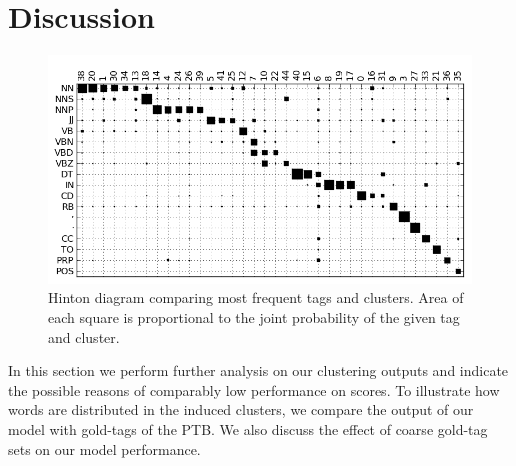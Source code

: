 \section{Discussion}
\label{sec:discuss}
\begin{figure}[ht] \centering
\includegraphics[width=\textwidth]{hinton.png}
\caption{Hinton diagram comparing most frequent tags and clusters.
  Area of each square is proportional to the joint probability of the
  given tag and cluster.}
\label{plot-hinton}
\end{figure}

In this section we perform further analysis on our clustering outputs
and indicate the possible reasons of comparably low performance on \vm
scores.  To illustrate how words are distributed in the induced
clusters, we compare the output of our model with gold-tags of the
PTB.  We also discuss the effect of coarse gold-tag sets on our model
performance.

